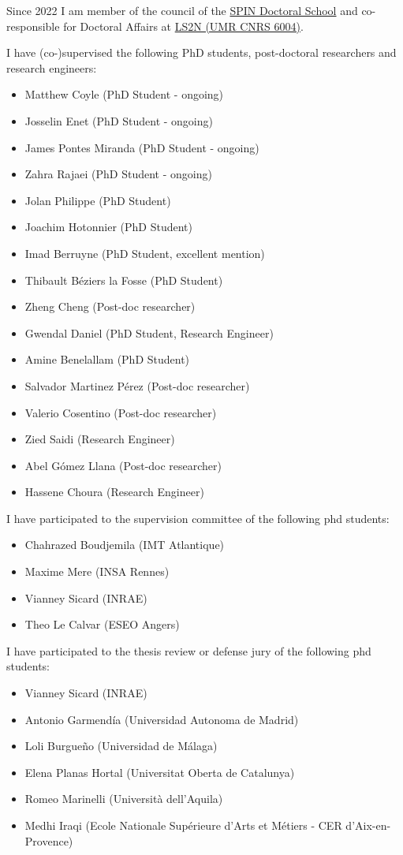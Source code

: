 Since 2022 I am member of the council of the
\href{https://ed-spin.doctorat-bretagne.fr/}{SPIN Doctoral School} and
co-responsible for Doctoral Affairs at \href{http://www.ls2n.fr/}{LS2N
(UMR CNRS 6004)}.

I have (co-)supervised the following PhD students, post-doctoral
researchers and research engineers:

\begin{itemize}
\item
  Matthew Coyle (PhD Student - ongoing)
\item
  Josselin Enet (PhD Student - ongoing)
\item
  James Pontes Miranda (PhD Student - ongoing)
\item
  Zahra Rajaei (PhD Student - ongoing)
\item
  Jolan Philippe (PhD Student)
\item
  Joachim Hotonnier (PhD Student)
\item
  Imad Berruyne (PhD Student, excellent mention)
\item
  Thibault Béziers la Fosse (PhD Student)
\item
  Zheng Cheng (Post-doc researcher)
\item
  Gwendal Daniel (PhD Student, Research Engineer)
\item
  Amine Benelallam (PhD Student)
\item
  Salvador Martinez Pérez (Post-doc researcher)
\item
  Valerio Cosentino (Post-doc researcher)
\item
  Zied Saidi (Research Engineer)
\item
  Abel Gómez Llana (Post-doc researcher)
\item
  Hassene Choura (Research Engineer)
\end{itemize}

I have participated to the supervision committee of the following phd
students:

\begin{itemize}
\tightlist
\item
  Chahrazed Boudjemila (IMT Atlantique)
\item
  Maxime Mere (INSA Rennes)
\item
  Vianney Sicard (INRAE)
\item
  Theo Le Calvar (ESEO Angers)
\end{itemize}

I have participated to the thesis review or defense jury of the
following phd students:

\begin{itemize}
\tightlist
\item
  Vianney Sicard (INRAE)
\item
  Antonio Garmendía (Universidad Autonoma de Madrid)
\item
  Loli Burgueño (Universidad de Málaga)
\item
  Elena Planas Hortal (Universitat Oberta de Catalunya)
\item
  Romeo Marinelli (Università dell'Aquila)
\item
  Medhi Iraqi (Ecole Nationale Supérieure d'Arts et Métiers - CER
  d'Aix-en-Provence)
\end{itemize}
